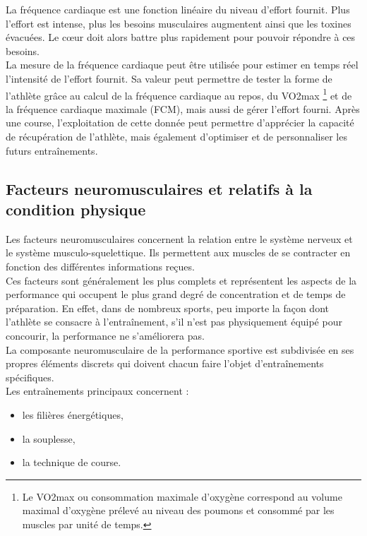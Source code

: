         La fréquence cardiaque est une fonction linéaire du niveau d'effort fournit. Plus l'effort est intense, plus les besoins musculaires augmentent ainsi que les toxines évacuées. Le cœur doit alors battre plus rapidement pour pouvoir répondre à ces besoins. \\
        
        La mesure de la fréquence cardiaque peut être utilisée pour estimer en temps réel l'intensité de l'effort fournit. Sa valeur peut permettre de tester la forme de l'athlète grâce au calcul de la fréquence cardiaque au repos, du VO2max \footnote{Le VO2max ou consommation maximale d'oxygène correspond au volume maximal d'oxygène prélevé au niveau des poumons et consommé par les muscles par unité de temps.} et de la fréquence cardiaque maximale (FCM), mais aussi de gérer l'effort fourni. Après une course, l'exploitation de cette donnée peut permettre d'apprécier la capacité de récupération de l'athlète, mais également d'optimiser et de personnaliser les futurs entraînements. \\
    
        
        \subsection{Facteurs neuromusculaires et relatifs à la condition physique}
        
        Les facteurs neuromusculaires concernent la relation entre le système nerveux et le système musculo-squelettique. Ils permettent aux muscles de se contracter en fonction des différentes informations reçues.\\
        
        Ces facteurs sont généralement les plus complets et représentent les aspects de la performance qui occupent le plus grand degré de concentration et de temps de préparation. En effet, dans de nombreux sports, peu importe la façon dont l'athlète se consacre à l'entraînement, s'il n'est pas physiquement équipé pour concourir, la performance ne s'améliorera pas.\\
        
        La composante neuromusculaire de la performance sportive est subdivisée en ses propres éléments discrets qui doivent chacun faire l'objet d'entraînements spécifiques.\\
        
        Les entraînements principaux concernent :
            \begin{itemize}
                \item les filières énergétiques,
                \item la souplesse,
                \item la technique de course.\\
            \end{itemize}
        
